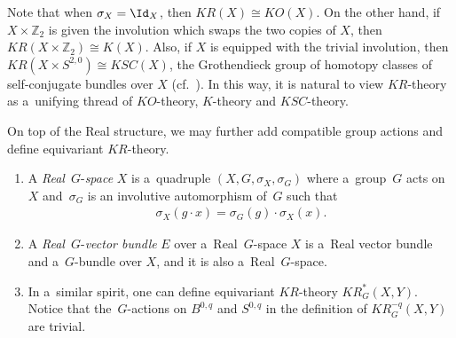 Note that when $\sigma_X=\Id_X$, then $KR(X)\cong KO(X)$.
On the other hand, if $X\times \mathbb{Z}_2$ is given the involution which swaps the two copies of $X$, then
$KR(X\times\mathbb{Z}_2)\cong K(X)$.
Also, if $X$ is equipped with the trivial involution, then $KR(X\times S^{2,0})\cong KSC(X)$, the Grothendieck group of
homotopy classes of self-conjugate bundles over $X$ (cf.~\cite{At3}).
In this way, it is natural to view $KR$-theory as a~unifying thread of $KO$-theory, $K$-theory and $KSC$-theory.

On top of the Real structure, we may further add compatible group actions and def\/ine equivariant $KR$-theory.
\begin{Definition}\label{eqkrtheory}\quad
\begin{enumerate}\itemsep=0pt
\item
A \emph{Real}~$G$-\emph{space} $X$ is a~quadruple $(X, G,
\sigma_X, \sigma_G)$ where a~group~$G$ acts on~$X$ and~$\sigma_G$ is an involutive automorphism of~$G$ such that
\begin{gather*}
\sigma_X(g\cdot x)=\sigma_G(g)\cdot\sigma_X(x).
\end{gather*}
\item
A \emph{Real}~$G$-\emph{vector bundle} $E$ over a~Real~$G$-space $X$ is a~Real vector bundle and a~$G$-bundle over $X$,
and it is also a~Real~$G$-space.
\item
In a~similar spirit, one can def\/ine equivariant $KR$-theory $KR_G^*(X, Y)$.
Notice that the~$G$-actions on $B^{0,q}$ and $S^{0,q}$ in the def\/inition of $KR_G^{-q}(X, Y)$ are trivial.
\end{enumerate}
\end{Definition}

